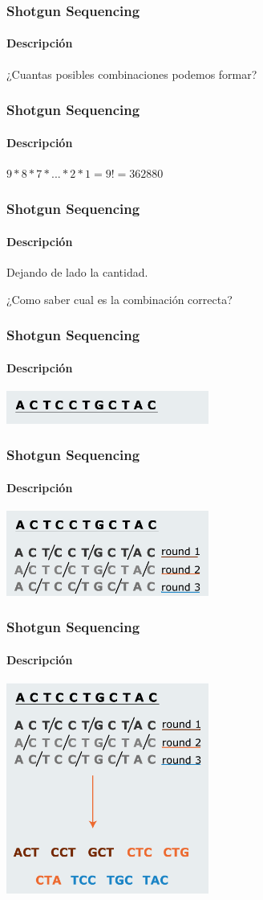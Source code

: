 \frame
{
\frametitle{Shotgun Sequencing}
\framesubtitle{Descripción}

\begin{center}
	\huge ¿Cuantas posibles combinaciones podemos formar?
\end{center}
}

\frame
{
\frametitle{Shotgun Sequencing}
\framesubtitle{Descripción}

\begin{center}
	\huge $9 * 8 * 7 * ... * 2 * 1 = 9! = 362880$
\end{center}
}

\frame
{
\frametitle{Shotgun Sequencing}
\framesubtitle{Descripción}

Dejando de lado la cantidad.\\

\begin{center}
	\huge ¿Como saber cual es la combinación correcta?
\end{center}
}

\frame
{
\frametitle{Shotgun Sequencing}
\framesubtitle{Descripción}

\begin{center}
	\includegraphics[width=0.5\textwidth]{img/tecnica1-2.png}
\end{center}

}

\frame
{
\frametitle{Shotgun Sequencing}
\framesubtitle{Descripción}

\begin{center}
	\includegraphics[width=0.5\textwidth]{img/tecnica1-3.png}
\end{center}

}

\frame
{
\frametitle{Shotgun Sequencing}
\framesubtitle{Descripción}

\begin{center}
	\includegraphics[width=0.5\textwidth]{img/tecnica1-4.png}
\end{center}

}

